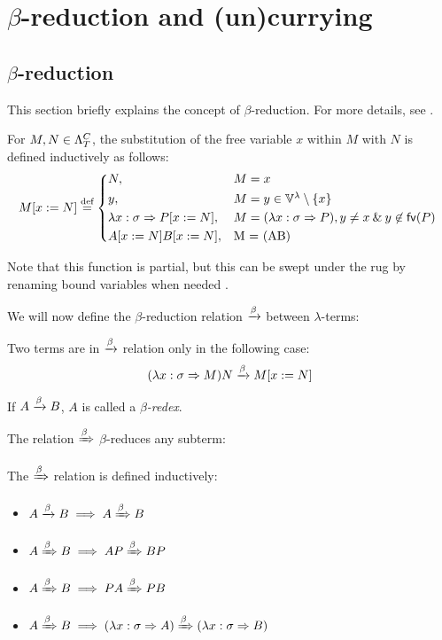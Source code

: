 \documentclass[main.tex]{subfiles}
\begin{document}
\section{$\beta$-reduction and (un)currying}
\label{betacurry}

\subsection{$\beta$-reduction}
This section briefly explains the concept of $\beta$-reduction. For more details,
see \cite{pierce}.

\begin{defn}
    For $M, N \in \plambda{T}{C}$, the substitution of the free variable
    $x$ within $M$ with $N$ is defined inductively as follows:
    \[
        \subst{M}{x}{N} \defeq
        \begin{cases*}
            N, & $M = x$ \\
            y, & $M = y \in \lvars \setminus \{ x \}$ \\
            \lambda x : \sigma \abstr \subst{P}{x}{N},
                & $M = (\lambda x : \sigma \abstr P), y \ne x \land y \not\in \fv{P}$ \\
            \subst{A}{x}{N} \subst{B}{x}{N}, & M = (AB) \\
        \end{cases*}
    \]

    Note that this function is partial, but this can be swept under the rug
    by renaming bound variables when needed \cite{pierce}.
\end{defn}

We will now define the $\beta$-reduction relation $\betared$ between $\lambda$-terms:
\begin{defn}
    Two terms are in $\betared$ relation only in the following case:
    \[ (\lambda x : \sigma \abstr M) N \betared \subst{M}{x}{N} \]

    If $A \betared B$, $A$ is called a \emph{$\beta$-redex}.
\end{defn}

The relation $\bbetared$ $\beta$-reduces any subterm:
\begin{defn}
    The $\bbetared$ relation is defined inductively:
    \begin{itemize}
        \item $A \betared B \implies A \bbetared B$
        \item $A \bbetared B \implies AP \bbetared BP$
        \item $A \bbetared B \implies PA \bbetared PB$
        \item $A \bbetared B \implies (\lambda x : \sigma \abstr A)
            \bbetared (\lambda x : \sigma \abstr B)$
    \end{itemize}
\end{defn}
\end{document}

